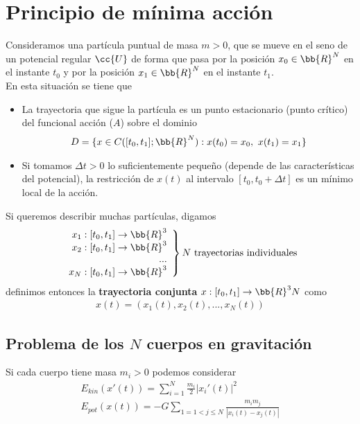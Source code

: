 \section{Principio de mínima acción}

Consideramos una partícula puntual de masa $m>0$, que se mueve en el seno de un potencial regular $\cc{U}$ de forma que pasa por la posición $x_0\in \bb{R}^N$ en el instante $t_0$ y por la posición $x_1\in \bb{R}^N$ en el instante $t_1$. \\

En esta situación se tiene que 
\begin{itemize}
    \item La trayectoria que sigue la partícula es un punto estacionario (punto crítico) del funcional acción ($A$) sobre el dominio
    \begin{gather*}
        D = \{x\in C([t_0, t_1];\bb{R}^N) : x(t_0) = x_0,\ x(t_1) = x_1\}
    \end{gather*}

    \item Si tomamos $\Delta t>0$ lo suficientemente pequeño (depende de las características del potencial), la restricción de $x(t)$ al intervalo $[t_0, t_0+\Delta t]$ es un mínimo local de la acción.
\end{itemize}
Si queremos describir muchas partículas, digamos 
\begin{gather*}
    \left.
        \begin{array}{r}
            x_1:[t_0,t_1] \to \bb{R}^3\\
            x_2:[t_0,t_1] \to \bb{R}^3\\
            ...\\
            x_N:[t_0,t_1] \to \bb{R}^3\\
        \end{array}
    \right\} N \text{ trayectorias individuales}
\end{gather*}
definimos entonces la \textbf{trayectoria conjunta} $x:[t_0, t_1]\to \bb{R}^3N$ como 
\begin{gather*}
    x(t) = (x_1(t), x_2(t), ..., x_N(t))
\end{gather*}

\subsection{Problema de los $N$ cuerpos en gravitación}

Si cada cuerpo tiene masa $m_i>0$ podemos considerar
\begin{gather*}
    E_{kin}(x'(t)) = \sum_{i=1}^N \frac{m_i}{2} |x_i'(t)|^2\\
    E_{pot}(x(t)) = -G \sum_{1=1<j \leq N} \frac{m_i m_j}{|x_i(t)-x_j(t)|}
\end{gather*}

